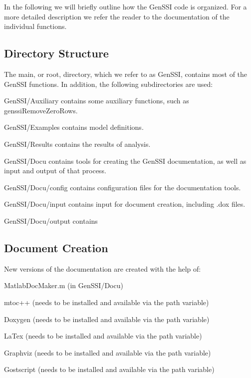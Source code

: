 In the following we will briefly outline how the Gen\+S\+SI code is organized. For a more detailed description we refer the reader to the documentation of the individual functions.\hypertarget{code_directory}{}\subsection{Directory Structure}\label{code_directory}
The main, or root, directory, which we refer to as Gen\+S\+SI, contains most of the Gen\+S\+SI functions. In addition, the following subdirectories are used\+:


\begin{DoxyItemize}
\item Gen\+S\+S\+I/\+Auxiliary contains some auxiliary functions, such as genssi\+Remove\+Zero\+Rows.
\item Gen\+S\+S\+I/\+Examples contains model definitions.
\item Gen\+S\+S\+I/\+Results contains the results of analysis.
\item Gen\+S\+S\+I/\+Docu contains tools for creating the Gen\+S\+SI documentation, as well as input and output of that process.
\item Gen\+S\+S\+I/\+Docu/config contains configuration files for the documentation tools.
\item Gen\+S\+S\+I/\+Docu/input contains input for document creation, including .dox files.
\item Gen\+S\+S\+I/\+Docu/output contains
\end{DoxyItemize}\hypertarget{code_document}{}\subsection{Document Creation}\label{code_document}
New versions of the documentation are created with the help of\+:


\begin{DoxyItemize}
\item Matlab\+Doc\+Maker.\+m (in Gen\+S\+S\+I/\+Docu)
\item mtoc++ (needs to be installed and available via the path variable)
\item Doxygen (needs to be installed and available via the path variable)
\item La\+Tex (needs to be installed and available via the path variable)
\item Graphviz (needs to be installed and available via the path variable)
\item Gostscript (needs to be installed and available via the path variable)
\end{DoxyItemize}

